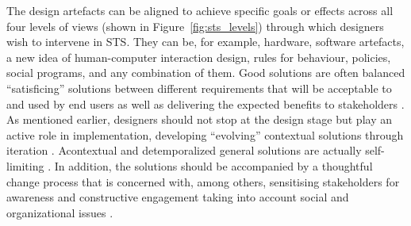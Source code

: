 The design artefacts can be aligned to achieve specific goals or effects across all four levels of views (shown in Figure~\ref{fig:sts_levels}) through which designers wish to intervene in STS. They can be, for example, hardware, software artefacts, a new idea of human-computer interaction design, rules for behaviour, policies, social programs, and any combination of them. Good solutions are often balanced ``satisficing'' solutions between different requirements that will be acceptable to and used by end users as well as delivering the expected benefits to stakeholders \cite{Baxter2011,Norman2015}. 
As mentioned earlier, designers should not stop at the design stage but play an active role in implementation, developing ``evolving'' contextual solutions through iteration \cite{Norman2015}. Acontextual and detemporalized general solutions are actually self-limiting \cite{Sawyer2014}. 
% 
In addition, the solutions should be accompanied by a thoughtful change process that is concerned with, among others, sensitising stakeholders for awareness and constructive engagement taking into account social and organizational issues \cite{Baxter2011}.


%
%
%


